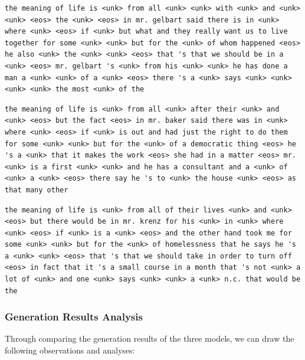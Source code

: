 \documentclass[12pt,oneside]{article}
\begin{document}
\begin{lstlisting}[caption=Transformer Model Generation]
the meaning of life is <unk> from all <unk> <unk> with <unk> and <unk> <unk> <eos> the <unk> <eos> in mr. gelbart said there is in <unk> where <unk> <eos> if <unk> but what and they really want us to live together for some <unk> <unk> but for the <unk> of whom happened <eos> he also <unk> the <unk> <unk> <eos> that 's that we should be in a <unk> <eos> mr. gelbart 's <unk> from his <unk> <unk> he has done a man a <unk> <unk> of a <unk> <eos> there 's a <unk> says <unk> <unk> <unk> <unk> the most <unk> of the
\end{lstlisting}

\begin{lstlisting}[caption=LSTM Model Generation]
the meaning of life is <unk> from all <unk> after their <unk> and <unk> <eos> but the fact <eos> in mr. baker said there was in <unk> where <unk> <eos> if <unk> is out and had just the right to do them for some <unk> <unk> but for the <unk> of a democratic thing <eos> he 's a <unk> that it makes the work <eos> she had in a matter <eos> mr. <unk> is a first <unk> <unk> and he has a consultant and a <unk> of <unk> a <unk> <eos> there say he 's to <unk> the house <unk> <eos> as that many other
\end{lstlisting}

\begin{lstlisting}[caption=RNN Model Generation]
the meaning of life is <unk> from all of their lives <unk> and <unk> <eos> but there would be in mr. krenz for his <unk> in <unk> where <unk> <eos> if <unk> is a <unk> <eos> and the other hand took me for some <unk> <unk> but for the <unk> of homelessness that he says he 's a <unk> <unk> <eos> that 's that we should take in order to turn off <eos> in fact that it 's a small course in a month that 's not <unk> a lot of <unk> and one <unk> says <unk> <unk> a <unk> n.c. that would be the
\end{lstlisting}

\subsubsection{Generation Results Analysis}

Through comparing the generation results of the three models, we can draw the following observations and analyses:
\end{document}
